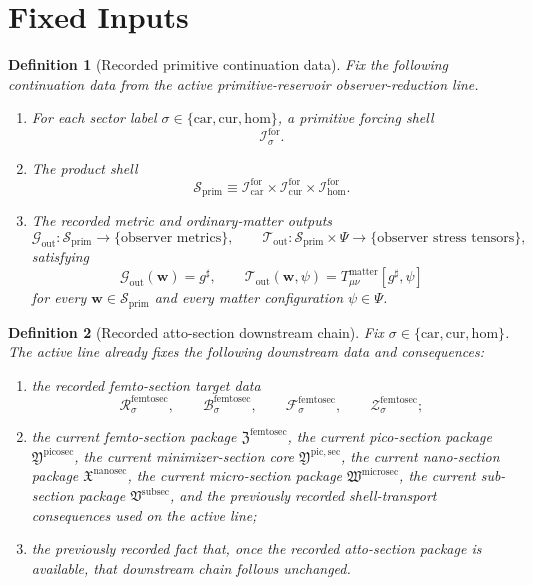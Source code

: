\documentclass[11pt]{article}
\newcommand{\CompletedMetric}{g^{\sharp}}
\newcommand{\MatterSpace}{\Psi}
\newcommand{\Car}{\mathrm{car}}
\newcommand{\Cur}{\mathrm{cur}}
\newcommand{\Hom}{\mathrm{hom}}
\newcommand{\ForSpace}[1]{\mathcal I_{#1}^{\mathrm{for}}}
\newcommand{\PrimShell}{\mathcal S_{\mathrm{prim}}}
\newcommand{\MetricOut}{\mathscr G_{\mathrm{out}}}
\newcommand{\MatterOut}{\mathscr T_{\mathrm{out}}}
\newcommand{\SubSectionPackage}{\mathfrak V^{\mathrm{subsec}}}
\newcommand{\MicroSectionPackage}{\mathfrak W^{\mathrm{microsec}}}
\newcommand{\NanoSectionPackage}{\mathfrak X^{\mathrm{nanosec}}}
\newcommand{\PicoSectionPackage}{\mathfrak Y^{\mathrm{picosec}}}
\newcommand{\PicoMinSectionCore}{\mathfrak Y^{\mathrm{pic,sec}}}
\newcommand{\FemtoSectionPackage}{\mathfrak Z^{\mathrm{femtosec}}}
\newcommand{\FemtoSectionSpace}[1]{\mathcal R_{#1}^{\mathrm{femtosec}}}
\newcommand{\FemtoSectionBody}[1]{\mathcal B_{#1}^{\mathrm{femtosec}}}
\newcommand{\FemtoSectionFunctional}[1]{\mathscr F_{#1}^{\mathrm{femtosec}}}
\newcommand{\FemtoSectionShell}[1]{\mathcal Z_{#1}^{\mathrm{femtosec}}}
\newtheorem{definition}{Definition}
\begin{document}
\section{Fixed Inputs}

\begin{definition}[Recorded primitive continuation data]
\label{def:fixed}
Fix the following continuation data from the active primitive-reservoir observer-reduction line.
\begin{enumerate}
    \item For each sector label \(\sigma\in\{\Car,\Cur,\Hom\}\), a primitive forcing shell
    \[
    \ForSpace{\sigma}.
    \]
    \item The product shell
    \[
    \PrimShell
    \equiv
    \ForSpace{\Car}\times \ForSpace{\Cur}\times \ForSpace{\Hom}.
    \]
    \item The recorded metric and ordinary-matter outputs
    \[
    \MetricOut:\PrimShell\to\{\text{observer metrics}\},
    \qquad
    \MatterOut:\PrimShell\times\MatterSpace\to\{\text{observer stress tensors}\},
    \]
    satisfying
    \begin{equation}
    \MetricOut(\mathbf w)=\CompletedMetric,
    \qquad
    \MatterOut(\mathbf w,\psi)
    =
    T_{\mu\nu}^{\mathrm{matter}}[\CompletedMetric,\psi]
    \label{eq:fixedoutputs}
    \end{equation}
    for every \(\mathbf w\in\PrimShell\) and every matter configuration \(\psi\in\MatterSpace\).
\end{enumerate}
\end{definition}

\begin{definition}[Recorded atto-section downstream chain]
\label{def:downstream}
Fix \(\sigma\in\{\Car,\Cur,\Hom\}\). The active line already fixes the following downstream data and consequences:
\begin{enumerate}
    \item the recorded femto-section target data
    \[
    \FemtoSectionSpace{\sigma},\qquad
    \FemtoSectionBody{\sigma},\qquad
    \FemtoSectionFunctional{\sigma},\qquad
    \FemtoSectionShell{\sigma};
    \]
    \item the current femto-section package \(\FemtoSectionPackage\), the current pico-section package \(\PicoSectionPackage\), the current minimizer-section core \(\PicoMinSectionCore\), the current nano-section package \(\NanoSectionPackage\), the current micro-section package \(\MicroSectionPackage\), the current sub-section package \(\SubSectionPackage\), and the previously recorded shell-transport consequences used on the active line;
    \item the previously recorded fact that, once the recorded atto-section package is available, that downstream chain follows unchanged.
\end{enumerate}
\end{definition}
\end{document}
